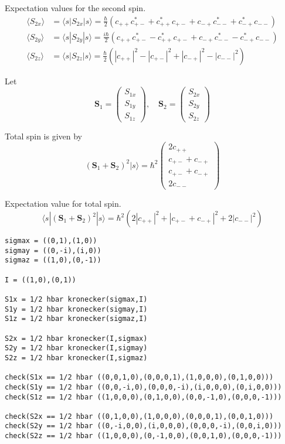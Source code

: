 Expectation values for the second spin.
\begin{align*}
\langle S_{2x}\rangle&=\langle s|S_{2x}|s\rangle
=\tfrac{\hbar}{2}
\left(c_{++}c_{+-}^*+c_{++}^*c_{+-}+c_{-+}c_{--}^*+c_{-+}^*c_{--}\right)
\\
\langle S_{2y}\rangle&=\langle s|S_{2y}|s\rangle
=\tfrac{i\hbar}{2}
\left(c_{++}c_{+-}^*-c_{++}^*c_{+-}+c_{-+}c_{--}^*-c_{-+}^*c_{--}\right)
\\
\langle S_{2z}\rangle&=\langle s|S_{2z}|s\rangle
=\tfrac{\hbar}{2}\left(|c_{++}|^2-|c_{+-}|^2+|c_{-+}|^2-|c_{--}|^2\right)
\end{align*}

Let
\begin{equation*}
\mathbf S_1=\begin{pmatrix}S_{1x}\\S_{1y}\\S_{1z}\end{pmatrix},\quad
\mathbf S_2=\begin{pmatrix}S_{2x}\\S_{2y}\\S_{2z}\end{pmatrix}
\end{equation*}

Total spin is given by
\begin{equation*}
(\mathbf S_1+\mathbf S_2)^2|s\rangle
=\hbar^2\begin{pmatrix}2c_{++}\\c_{+-}+c_{-+}\\c_{+-}+c_{-+}\\2c_{--}\end{pmatrix}
\end{equation*}

Expectation value for total spin.
\begin{equation*}
\langle s|(\mathbf S_1+\mathbf S_2)^2|s\rangle
=\hbar^2\left(2|c_{++}|^2+|c_{+-}+c_{-+}|^2+2|c_{--}|^2\right)
\end{equation*}

\newpage
{}

{\footnotesize\begin{verbatim}
sigmax = ((0,1),(1,0))
sigmay = ((0,-i),(i,0))
sigmaz = ((1,0),(0,-1))

I = ((1,0),(0,1))

S1x = 1/2 hbar kronecker(sigmax,I)
S1y = 1/2 hbar kronecker(sigmay,I)
S1z = 1/2 hbar kronecker(sigmaz,I)

S2x = 1/2 hbar kronecker(I,sigmax)
S2y = 1/2 hbar kronecker(I,sigmay)
S2z = 1/2 hbar kronecker(I,sigmaz)

check(S1x == 1/2 hbar ((0,0,1,0),(0,0,0,1),(1,0,0,0),(0,1,0,0)))
check(S1y == 1/2 hbar ((0,0,-i,0),(0,0,0,-i),(i,0,0,0),(0,i,0,0)))
check(S1z == 1/2 hbar ((1,0,0,0),(0,1,0,0),(0,0,-1,0),(0,0,0,-1)))

check(S2x == 1/2 hbar ((0,1,0,0),(1,0,0,0),(0,0,0,1),(0,0,1,0)))
check(S2y == 1/2 hbar ((0,-i,0,0),(i,0,0,0),(0,0,0,-i),(0,0,i,0)))
check(S2z == 1/2 hbar ((1,0,0,0),(0,-1,0,0),(0,0,1,0),(0,0,0,-1)))
\end{verbatim}}

